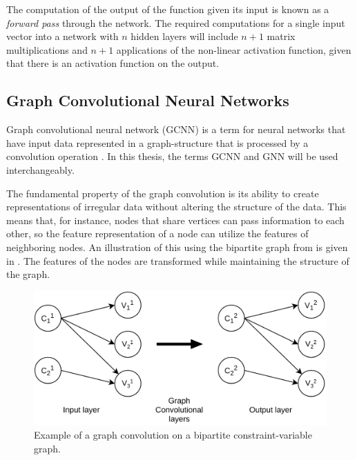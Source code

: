 The computation of the output of the function given its input is known as a \textit{forward pass} through the network. The required computations for a single input vector into a network with $ n $ hidden layers will include $ n + 1 $ matrix multiplications and $ n + 1 $ applications of the non-linear activation function, given that there is an activation function on the output. 











\subsection{Graph Convolutional Neural Networks }

Graph convolutional neural network (\gls{GCNN}) is a term for neural networks that have input data represented in a graph-structure that is processed by a convolution operation \cite{kipf2016semisupervised}. In this thesis, the terms \gls{GCNN} and \gls{GNN} will be used interchangeably. 

The fundamental property of the graph convolution is its ability to create representations of irregular data without altering the structure of the data. This means that, for instance, nodes that share vertices can pass information to each other, so the feature representation of a node can utilize the features of neighboring nodes.  
An illustration of this using the bipartite graph from  is given in . The features of the nodes are transformed while maintaining the structure of the graph.

\begin{figure}
    \centering
    \includegraphics[width=0.8\linewidth]{img/conv_example.png}
    \caption{Example of a graph convolution on a bipartite constraint-variable graph.}
    \label{fig:conv_ex}
\end{figure}

